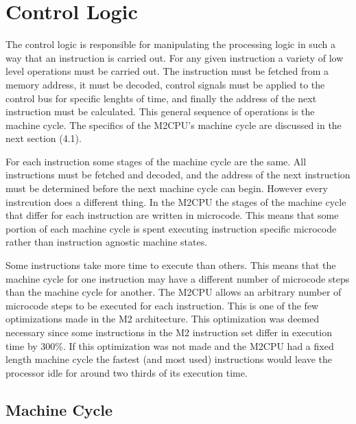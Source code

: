 \documentclass[a4paper,12pt]{article}
\newcommand{\mt}{M2CPU}
\newcommand{\mi}{M2 instruction set}
\newcommand{\ma}{M2 architecture}
\begin{document}
\newpage
\section{Control Logic}
The control logic is responsible for manipulating the processing logic in such
a way that an instruction is carried out. For any given instruction a variety
of low level operations must be carried out. The instruction must be fetched
from a memory address, it must be decoded, control signals must be applied to
the control bus for specific lenghts of time, and finally the address of the
next instruction must be calculated. This general sequence of operations is the
machine cycle. The specifics of the \mt{}'s machine cycle are discussed in the 
next section (4.1).
\par

For each instruction some stages of the machine cycle are the same. All 
instructions must be fetched and decoded, and the address of the next 
instruction must be determined before the next machine cycle can begin. However
every instrcution does a different thing. In the \mt{} the stages of the 
machine cycle that differ for each instruction are written in microcode. This
means that some portion of each machine cycle is spent executing instruction
specific microcode rather than instruction agnostic machine states.
\par

Some instructions take more time to execute than others. This means that the 
machine cycle for one instruction may have a different number of microcode 
steps than the machine cycle for another. The \mt{} allows an arbitrary number
of microcode steps to be executed for each instruction. This is one of the few
optimizations made in the \ma{}. This optimization was deemed necessary since
some instructions in the \mi{} differ in execution time by 300\%. If this
optimization was not made and the \mt{} had a fixed length machine cycle the
fastest (and most used) instructions would leave the processor idle for around
two thirds of its execution time.
\par

\subsection{Machine Cycle}
\end{document}
